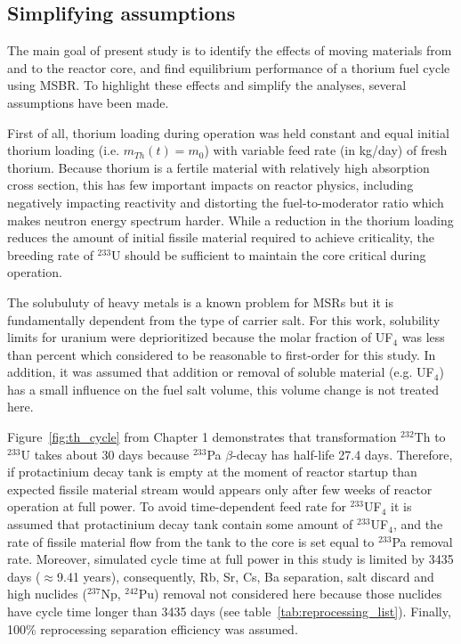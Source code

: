 \subsection{Simplifying assumptions}
The main goal of present study is to identify the effects of moving materials from and to the reactor core, and find equilibrium performance of a thorium fuel cycle using \gls{MSBR}. To highlight these effects and simplify the analyses, several assumptions have been made.

First of all, thorium loading during operation was held constant and equal initial thorium loading (i.e. $m_{Th}(t)=m_0$) with variable feed rate (in kg/day) of fresh thorium. Because thorium is a fertile material with relatively high absorption cross section, this has few important impacts on reactor physics, including negatively impacting reactivity and distorting the fuel-to-moderator ratio which makes neutron energy spectrum harder. While a reduction in the thorium loading reduces the amount of initial fissile material required to achieve criticality, the breeding rate of $^{233}$U should be sufficient to maintain the core critical during operation.

The solubuluty of heavy metals is a known problem for \glspl{MSR} but it is fundamentally dependent from the type of carrier salt. For this work, solubility limits for uranium were deprioritized because the molar fraction of UF$_4$ was less than percent which considered to be reasonable to first-order for this study. In addition, it was assumed that addition or removal of soluble material (e.g. UF$_4$) has a small influence on the fuel salt volume, this volume change is not treated here.

Figure~\ref{fig:th_cycle} from Chapter 1 demonstrates that transformation $^{232}$Th to $^{233}$U takes about 30 days because $^{233}$Pa $\beta$-decay has half-life 27.4 days. Therefore, if protactinium decay tank is empty at the moment of reactor startup than expected fissile material stream would appears only after few weeks of reactor operation at full power. To avoid time-dependent feed rate for $^{233}$UF$_4$ it is assumed that protactinium decay tank contain some amount of $^{233}$UF$_4$, and the rate of fissile material flow from the tank to the core is set equal to $^{233}$Pa removal rate. Moreover, simulated cycle time at full power in this study is limited by 3435 days ($\approx$9.41 years), consequently, Rb, Sr, Cs, Ba separation, salt discard and high nuclides ($^{237}$Np, $^{242}$Pu) removal not considered here because those nuclides have cycle time longer than 3435 days (see table~\ref{tab:reprocessing_list}). Finally, 100\% reprocessing separation efficiency was assumed.

